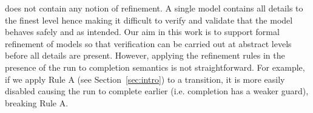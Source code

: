 \SCXML does not contain any notion of refinement. 
A single model contains all details to the finest level hence making it difficult to verify and validate that the model behaves safely and as intended.
Our aim in this work is to support formal refinement of \SCXML models so that verification can be carried out at abstract levels before all details are present.
However, applying the refinement rules in the presence of the run to completion semantics is not straightforward.
For example, if we apply Rule A (see Section~\ref{sec:intro}) to a transition, it is more easily disabled causing the run to complete earlier (i.e. completion has a weaker guard), breaking Rule A.


